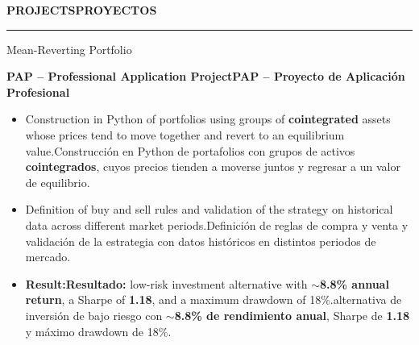 \documentclass[10pt,a4paper,withhyper]{altacv}
\newcommand{\tr}[2]{\ifEN #2\else #1\fi}
\renewcommand{\cvsection}[2][]{%
  \Needspace{8\baselineskip}%
  \nointerlineskip\smallskip%
  \ifstrequal{#1}{}{}{\marginpar{\vspace*{\dimexpr1pt-\baselineskip}\raggedright}}%
  {\color{heading}\cvsectionfont\MakeUppercase{#2}}\\[-1.2ex]%
  {\color{headingrule}\rule{\linewidth}{2pt}\par}\smallskip
}
\renewcommand{\cvevent}[4]{%
  \Needspace{6\baselineskip}%
  {\large\color{emphasis}#1\par}
  \smallskip\normalsize
  \ifstrequal{#2}{}{}{%
  \textbf{\color{accent}#2}\par
  \smallskip}%
  \ifstrequal{#3}{}{}{%
    {\small\makebox[0.5\linewidth][l]%
      {\BeginAccSupp{method=pdfstringdef,ActualText={\datename:}}\cvDateMarker\EndAccSupp{}~#3}%
    }}%
  \ifstrequal{#4}{}{}{%
    {\small\makebox[0.5\linewidth][l]%
      {\BeginAccSupp{method=pdfstringdef,ActualText={\locationname:}}\cvLocationMarker\EndAccSupp{}~#4}%
    }}\par
  \smallskip\normalsize
}
\renewcommand{\divider}{\smallskip\textcolor{body!30}{\hdashrule{\linewidth}{0.6pt}{0.5ex}}\smallskip}
\renewcommand{\cvsectionfont}{\large\bfseries}
\begin{document}
\cvsection{\tr{Proyectos}{Projects}}

\cvevent{Mean-Reverting Portfolio}{\tr{PAP – Proyecto de Aplicación Profesional}{PAP – Professional Application Project}}{}{}
\begin{itemize}
\item \tr{Construcción en Python de portafolios con grupos de activos \textbf{cointegrados}, cuyos precios tienden a moverse juntos y regresar a un valor de equilibrio.}{Construction in Python of portfolios using groups of \textbf{cointegrated} assets whose prices tend to move together and revert to an equilibrium value.}
\item \tr{Definición de reglas de compra y venta y validación de la estrategia con datos históricos en distintos periodos de mercado.}{Definition of buy and sell rules and validation of the strategy on historical data across different market periods.}
\item \textbf{\tr{Resultado:}{Result:}} \tr{alternativa de inversión de bajo riesgo con \textbf{$\sim$8.8\% de rendimiento anual}, Sharpe de \textbf{1.18} y máximo drawdown de 18\%.}{low-risk investment alternative with \textbf{$\sim$8.8\% annual return}, a Sharpe of \textbf{1.18}, and a maximum drawdown of 18\%.}
\end{itemize}

\divider
\end{document}
